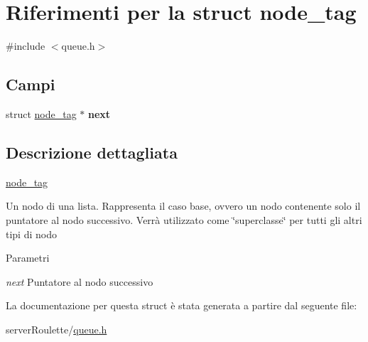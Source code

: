 \hypertarget{structnode__tag}{
\section{Riferimenti per la struct node\_\-tag}
\label{structnode__tag}
}


{\ttfamily \#include $<$queue.h$>$}

\subsection*{Campi}
\begin{DoxyCompactItemize}
\item 
\hypertarget{structnode__tag_a02dead73b57cb1d0b416547801f619cf}{
struct \hyperlink{structnode__tag}{node\_\-tag} $\ast$ {\bfseries next}}
\label{structnode__tag_a02dead73b57cb1d0b416547801f619cf}

\end{DoxyCompactItemize}


\subsection{Descrizione dettagliata}
\hyperlink{structnode__tag}{node\_\-tag}

Un nodo di una lista. Rappresenta il caso base, ovvero un nodo contenente solo il puntatore al nodo successivo. Verrà utilizzato come \char`\"{}superclasse\char`\"{} per tutti gli altri tipi di nodo


\begin{DoxyParams}{Parametri}
\item[{\em next}]Puntatore al nodo successivo \end{DoxyParams}


La documentazione per questa struct è stata generata a partire dal seguente file:\begin{DoxyCompactItemize}
\item 
serverRoulette/\hyperlink{queue_8h}{queue.h}\end{DoxyCompactItemize}
